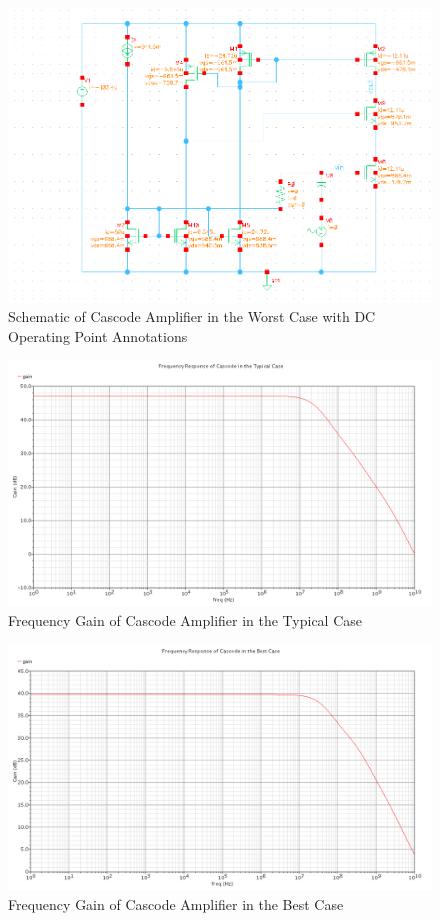 \documentclass{article}
\begin{document}
\begin{figure}[H]
\centering
\includegraphics[width=6in]{2_cas_dcop_ss.png}
\caption{Schematic of Cascode Amplifier in the Worst Case with DC Operating Point Annotations}
\label{cas_dcop_ss}
\end{figure}

\begin{figure}[H]
\centering
\includegraphics[width=5in]{2_cas_gain_tt.png}
\caption{Frequency Gain of Cascode Amplifier in the Typical Case}
\label{cas_tt}
\end{figure}

\begin{figure}[H]
\centering
\includegraphics[width=6in]{2_cas_gain_ff.png}
\caption{Frequency Gain of Cascode Amplifier in the Best Case}
\label{cas_ff}
\end{figure}
\end{document}
